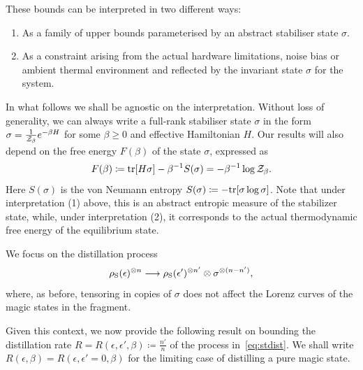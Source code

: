 \documentclass[pra,
aps,
twocolumn,
superscriptaddress,
groupedaddress,
nofootinbib,
reprint
]{revtex4-1}
\begin{document}
These bounds can be interpreted in two different ways: 
\begin{enumerate}
\item As a family of upper bounds parameterised by an abstract stabiliser state $\sigma$.
\item As a constraint arising from the actual hardware limitations, noise bias or ambient thermal environment and reflected by the invariant state $\sigma$ for the system.
\end{enumerate}
In what follows we shall be agnostic on the interpretation. Without loss of generality, we can always write a full-rank stabiliser state $\sigma$ in the form $\sigma =  \frac{1}{\mathcal{Z}_\beta} e^{-\beta H}$ for some $\beta \geq 0$ and effective Hamiltonian $H$. Our results will also depend on the free energy $F(\beta)$ of the state $\sigma$, expressed as
\begin{equation}
	F(\beta) \coloneqq {\rm{tr}}[H \sigma] - \beta^{-1}S(\sigma) = -\beta^{-1}\log{\mathcal{Z}_\beta}.
\end{equation}
Here $S(\sigma)$ is the von Neumann entropy $S(\sigma) \coloneqq -{\rm{tr}}[\sigma\log{\sigma}]$. Note that under interpretation (1) above, this is an abstract entropic measure of the stabilizer state, while, under interpretation (2), it corresponds to the actual thermodynamic free energy of the equilibrium state.

We focus on the distillation process
\begin{equation}\label{eq:stdist}
	\rho_{\rm{S}}(\epsilon)^{\otimes n} \longrightarrow \rho_{\rm{S}}(\epsilon')^{\otimes n'} \otimes \sigma^{\otimes (n-n')},
\end{equation}
where, as before, tensoring in copies of $\sigma$ does not affect the Lorenz curves of the magic states in the fragment.

Given this context, we now provide the following result on bounding the distillation rate $R = R(\epsilon, \epsilon', \beta) \coloneqq \frac{n'}{n}$ of the process in~\cref{eq:stdist}. We shall write $R(\epsilon, \beta) = R(\epsilon, \epsilon'=0, \beta)$ for the limiting case of distilling a pure magic state.
\end{document}
